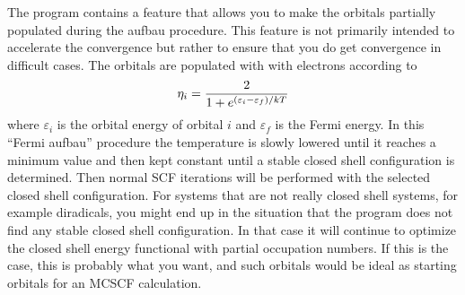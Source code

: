 The program contains a feature that allows you to make the
orbitals partially populated during the aufbau procedure.
This feature is not primarily intended to accelerate the convergence
but rather to ensure that you do get convergence in
difficult cases.
The orbitals are populated with with electrons according to
\begin{equation}
\eta_i={{2}\over{1+e^{(\varepsilon_i-\varepsilon_f)/kT}}}
\end{equation}
where
$\varepsilon_i$
is the orbital energy of orbital $i$ and
$\varepsilon_f$
is the Fermi energy.
In this ``Fermi aufbau'' procedure
the temperature is slowly lowered until it reaches a minimum
value and then kept constant until
a stable closed shell configuration is determined.
Then normal SCF iterations will be performed with the selected
closed shell configuration.
For systems that are not really closed shell systems, for example
diradicals, you might end up in the situation that the program
does not find any stable closed shell configuration.
In that case it will continue to optimize the closed shell
energy functional with partial occupation numbers.
If this is the case, this is probably what you want, and such
orbitals would be ideal as starting orbitals for an MCSCF
calculation.

